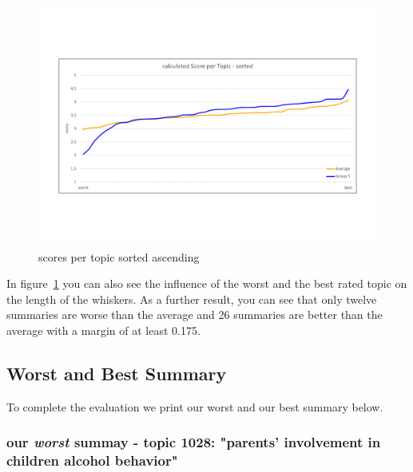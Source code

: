\begin{figure}[H]
	\centering
	\includegraphics[trim=0 150 0 150, width=\textwidth]{img/score_per_topic_sorted.pdf}
	\caption{scores per topic sorted ascending}
	\label{fig:spts}
\end{figure}

In figure~\ref{fig:spts} you can also see the influence of the worst and the best rated topic on the length of the whiskers.
As a further result, you can see that only twelve summaries are worse than the average and 26 summaries are better than the average with a margin of at least 0.175.

\subsection{Worst and Best Summary}
To complete the evaluation we print our worst and our best summary below.

\subsubsection*{our \emph{worst} summay - topic 1028: "parents' involvement in children alcohol behavior"}

